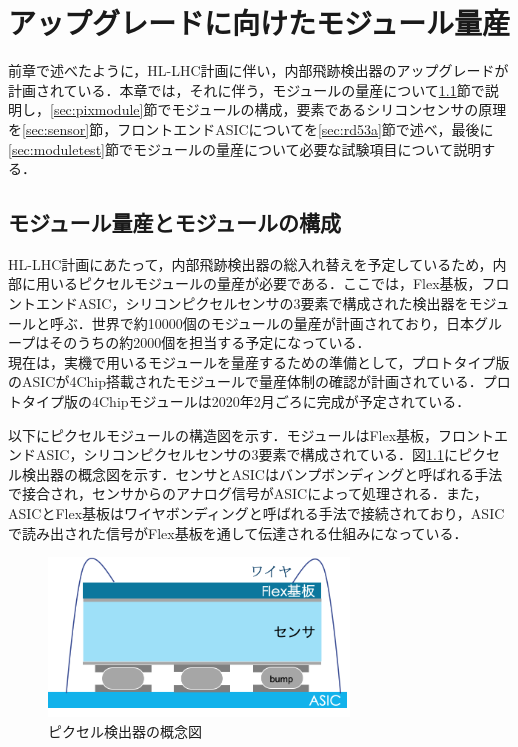 \chapter{アップグレードに向けたモジュール量産}
前章で述べたように，HL-LHC計画に伴い，内部飛跡検出器のアップグレードが計画されている．本章では，それに伴う，モジュールの量産について\ref{sec:masspro}節で説明し，\ref{sec:pixmodule}節でモジュールの構成，要素であるシリコンセンサの原理を\ref{sec:sensor}節，フロントエンドASICについてを\ref{sec:rd53a}節で述べ，最後に\ref{sec:moduletest}節でモジュールの量産について必要な試験項目について説明する．\\

\section{モジュール量産とモジュールの構成}
\label{sec:masspro}
HL-LHC計画にあたって，内部飛跡検出器の総入れ替えを予定しているため，内部に用いるピクセルモジュールの量産が必要である．ここでは，Flex基板，フロントエンドASIC，シリコンピクセルセンサの3要素で構成された検出器をモジュールと呼ぶ．世界で約10000個のモジュールの量産が計画されており，日本グループはそのうちの約2000個を担当する予定になっている．\\
現在は，実機で用いるモジュールを量産するための準備として，プロトタイプ版のASICが4$\mathrm{Chip}$搭載されたモジュールで量産体制の確認が計画されている．プロトタイプ版の4$\mathrm{Chip}$モジュールは2020年2月ごろに完成が予定されている．\par
以下にピクセルモジュールの構造図を示す．モジュールはFlex基板，フロントエンドASIC，シリコンピクセルセンサの3要素で構成されている．図\ref{fig:module}にピクセル検出器の概念図を示す．センサとASICはバンプボンディングと呼ばれる手法で接合され，センサからのアナログ信号がASICによって処理される．また，ASICとFlex基板はワイヤボンディングと呼ばれる手法で接続されており，ASICで読み出された信号がFlex基板を通して伝達される仕組みになっている．\par

\begin{figure}[h]
  \centering
  \includegraphics[width=8cm]{./figure/module.png}
  \caption{ピクセル検出器の概念図}
  \label{fig:module}
\end{figure}

